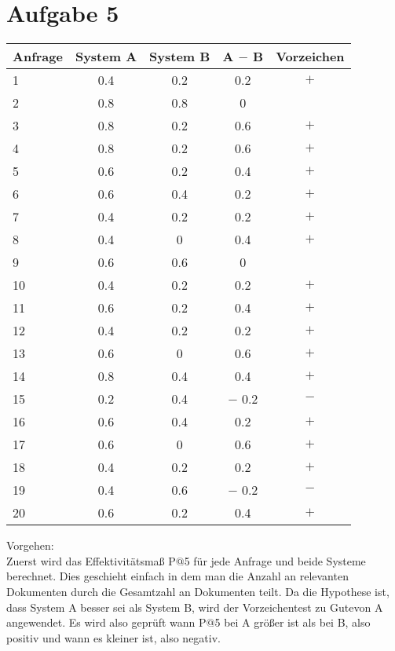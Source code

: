 \section*{Aufgabe 5}
\begin{center}
\begin{tabular}{|l|c|c|c|c|}
\hline 
Anfrage & System A & System B & A $ - $ B & Vorzeichen\\ 
\hline 
1 & 0.4 & 0.2 & 0.2 & $+$\\ 
\hline 
2 & 0.8 & 0.8 & 0 & \\ 
\hline 
3 & 0.8 & 0.2 & 0.6 & $+$\\ 
\hline 
4 & 0.8 & 0.2 & 0.6 & $+$\\ 
\hline 
5 & 0.6 & 0.2 & 0.4 & $+$\\ 
\hline 
6 & 0.6 & 0.4 & 0.2 & $+$\\ 
\hline 
7 & 0.4 & 0.2 & 0.2 & $+$\\ 
\hline 
8 & 0.4 & 0 & 0.4 & $+$\\ 
\hline 
9 & 0.6 & 0.6 & 0 & \\ 
\hline 
10 & 0.4 & 0.2 & 0.2 & $+$\\ 
\hline 
11 & 0.6 & 0.2 & 0.4 & $+$\\ 
\hline 
12 & 0.4 & 0.2 & 0.2 & $+$\\ 
\hline 
13 & 0.6 & 0 & 0.6 & $+$\\ 
\hline 
14 & 0.8 & 0.4 & 0.4 & $+$\\ 
\hline 
15 & 0.2 & 0.4 & $ - $ 0.2 & $-$\\ 
\hline 
16 & 0.6 & 0.4 & 0.2 & $+$\\ 
\hline 
17 & 0.6 & 0 & 0.6 & $+$\\ 
\hline 
18 & 0.4 & 0.2 & 0.2 & $+$\\ 
\hline 
19 & 0.4 & 0.6 & $ - $ 0.2 & $-$\\ 
\hline 
20 & 0.6 & 0.2 & 0.4 & $+$\\ 
\hline 
\end{tabular}
\end{center}
\vspace{1cm}
Vorgehen:\\
Zuerst wird das Effektivitätsmaß P$@$5 für jede Anfrage und beide Systeme berechnet. Dies geschieht einfach in dem man die Anzahl an relevanten Dokumenten durch die Gesamtzahl an Dokumenten teilt. Da die Hypothese ist, dass System A besser sei als System B, wird der Vorzeichentest \glqq zu Gute\grqq von A angewendet. Es wird also geprüft wann P$@$5 bei A größer ist als bei B, also positiv und wann es kleiner ist, also negativ. 
